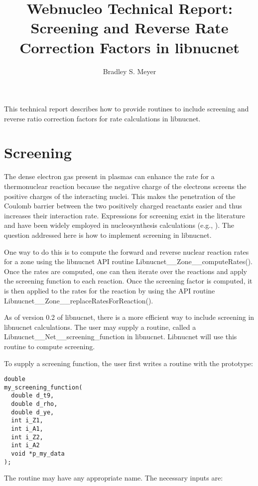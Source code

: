 \documentclass{article}    %
\title{Webnucleo Technical Report: Screening and Reverse Rate Correction
Factors in libnucnet}  %
\author{Bradley S. Meyer}
\begin{document}

\maketitle                 %


This technical report describes how to provide routines to include
screening and reverse ratio correction factors for rate calculations
in libnucnet.

\section{Screening}

The dense electron gas present in plasmas can enhance the rate for a
thermonuclear reaction because the negative charge of the electrons screens
the positive charges of the interacting nuclei.  This makes the penetration
of the Coulomb barrier between the two positively charged reactants easier
and thus increases their interaction rate.
Expressions for screening exist in the literature and have been widely
employed in nucleosynthesis calculations (e.g., \cite{1982ApJ...258..696W}).
The question addressed here is how to implement screening in libnucnet.

One way to do this is to compute the forward and reverse nuclear reaction
rates for a zone using the libnucnet API routine
Libnucnet\_\_Zone\_\_computeRates().
Once the rates are computed, one can
then iterate over the reactions and apply the screening function to each
reaction.  Once the screening factor is computed, it is then applied to
the rates for the reaction by using the API routine
Libnucnet\_\_Zone\_\_replaceRatesForReaction().

As of version 0.2 of libnucnet, there is a more efficient way to include
screening in libnucnet calculations.  The user may supply a routine,
called a Libnucnet\_\_Net\_\_screening\_function in libnucnet.  Libnucnet
will use this routine to compute screening.

To supply a screening function, the user first writes a routine with the
prototype:

\begin{verbatim}
double
my_screening_function(
  double d_t9,
  double d_rho,
  double d_ye,
  int i_Z1,
  int i_A1,
  int i_Z2,
  int i_A2
  void *p_my_data
);
\end{verbatim}

The routine may have any appropriate name.  The necessary inputs are:
\end{document}
